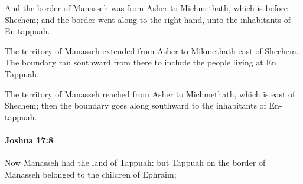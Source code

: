 			\begin{versebox}
					\item[BHS] 
					\item[ASV] And the border of Manasseh was from Asher to Michmethath, which is before Shechem; and the border went along to the right hand, unto the inhabitants of En-tappuah.
					\item[NIV] The territory of Manasseh extended from Asher to Mikmethath east of Shechem. The boundary ran southward from there to include the people living at En Tappuah.
					\item[NRSV] The territory of Manasseh reached from Asher to Michmethath, which is east of Shechem; then the boundary goes along southward to the inhabitants of En-tappuah.
			\end{versebox}

		\paragraph{Joshua 17:8} %
			\label{JOSHUA-17-8}

			Now Manasseh had the land of Tappuah: but Tappuah on the border of Manasseh belonged to the children of Ephraim;

